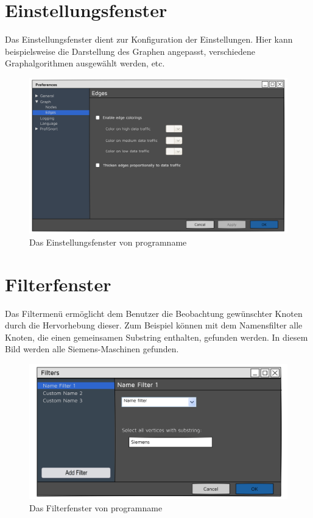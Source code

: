 \section{Einstellungsfenster}
Das Einstellungsfenster dient zur Konfiguration der Einstellungen. Hier kann beispielsweise die Darstellung des Graphen angepasst, verschiedene
Graphalgorithmen ausgewählt werden, etc.

  \begin{figure}[h!]
    \hspace*{0.3cm}\includegraphics[scale=0.07]{./img/Preferences.png}
    \caption[Das Einstellungsfenster von \gls{programname}]{Das Einstellungsfenster von \gls{programname}}
  \end{figure}

\newpage
\section{Filterfenster}
Das Filtermenü ermöglicht dem Benutzer die Beobachtung gewünschter Knoten durch die Hervorhebung dieser. Zum Beispiel können mit dem Namensfilter alle Knoten, die einen gemeinsamen Substring enthalten, gefunden werden. In diesem Bild werden alle Siemens-Maschinen gefunden.

\begin{figure}[h!]
  \hspace*{0.2cm}\includegraphics[scale=0.06]{./img/Filters.png}
  \caption[Das Filterfenster von \gls{programname}]{Das Filterfenster von \gls{programname}}
\end{figure}
